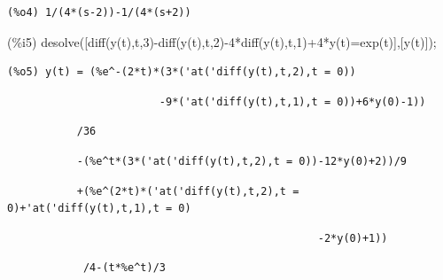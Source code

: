 \documentclass[
  letterpaper,
  DIV=11,
  numbers=noendperiod]{scrreprt}
\newenvironment{Shaded}{\begin{snugshade}}{\end{snugshade}}
\newcommand{\ConstantTok}[1]{\textcolor[rgb]{0.56,0.35,0.01}{#1}}
\newcommand{\DecValTok}[1]{\textcolor[rgb]{0.68,0.00,0.00}{#1}}
\newcommand{\FunctionTok}[1]{\textcolor[rgb]{0.28,0.35,0.67}{#1}}
\newcommand{\NormalTok}[1]{\textcolor[rgb]{0.00,0.23,0.31}{#1}}
\theoremstyle{plain}
\theoremstyle{remark}
\begin{document}
\begin{verbatim}
(%o4) 1/(4*(s-2))-1/(4*(s+2))
\end{verbatim}

\begin{Shaded}
\begin{Highlighting}[]
\NormalTok{(\%}\ConstantTok{i5}\NormalTok{) }\FunctionTok{desolve}\NormalTok{([}\FunctionTok{diff}\NormalTok{(}\ConstantTok{y}\NormalTok{(}\ConstantTok{t}\NormalTok{),}\ConstantTok{t}\NormalTok{,}\DecValTok{3}\NormalTok{){-}}\FunctionTok{diff}\NormalTok{(}\ConstantTok{y}\NormalTok{(}\ConstantTok{t}\NormalTok{),}\ConstantTok{t}\NormalTok{,}\DecValTok{2}\NormalTok{)}\DecValTok{{-}4}\NormalTok{*}\FunctionTok{diff}\NormalTok{(}\ConstantTok{y}\NormalTok{(}\ConstantTok{t}\NormalTok{),}\ConstantTok{t}\NormalTok{,}\DecValTok{1}\NormalTok{)}\DecValTok{+4}\NormalTok{*}\ConstantTok{y}\NormalTok{(}\ConstantTok{t}\NormalTok{)=}\FunctionTok{exp}\NormalTok{(}\ConstantTok{t}\NormalTok{)],[}\ConstantTok{y}\NormalTok{(}\ConstantTok{t}\NormalTok{)]);}
\end{Highlighting}
\end{Shaded}

\begin{verbatim}
(%o5) y(t) = (%e^-(2*t)*(3*('at('diff(y(t),t,2),t = 0))
\end{verbatim}

\begin{verbatim}
                        -9*('at('diff(y(t),t,1),t = 0))+6*y(0)-1))
\end{verbatim}

\begin{verbatim}
           /36
\end{verbatim}

\begin{verbatim}
           -(%e^t*(3*('at('diff(y(t),t,2),t = 0))-12*y(0)+2))/9
\end{verbatim}

\begin{verbatim}
           +(%e^(2*t)*('at('diff(y(t),t,2),t = 0)+'at('diff(y(t),t,1),t = 0)
\end{verbatim}

\begin{verbatim}
                                                 -2*y(0)+1))
\end{verbatim}

\begin{verbatim}
            /4-(t*%e^t)/3
\end{verbatim}
\end{document}
